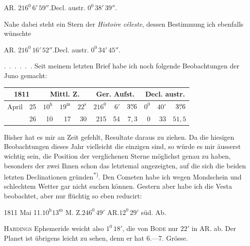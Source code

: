 \begin{center}
AR. $216^0\,6'\,59''$.\quad Decl. austr. $0^0\,38'\,39''$.
\end{center}
\noindent Nahe dabei steht ein Stern der \textit{Histoire céleste}, dessen Bestimmung ich ebenfalls wünschte
\begin{center}
AR. $216^0\,16'\,52''$.\quad Decl. austr. $0^0\,34'\,45''$.
\end{center}
\noindent\hspace*{\parindent}\mbox{. . . . . .} Seit meinem letzten Brief habe ich noch folgende Beobachtungen der Juno gemacht:
\begin{center}\renewcommand{\arraystretch}{1.15}
\begin{tabular}{lr|rrr|rrr|rrr}
\hline\hline
\multicolumn{2}{c|}{1811}&\multicolumn{3}{c|}{Mittl. Z.}&\multicolumn{3}{c|}{Ger. Aufst.}&\multicolumn{3}{c}{Decl. austr.}\\\hline\hline
April&25&$10^{\mathrm h}$&$19^{\mathrm m}$&$22^{\mathrm s}$&$216^0$&$6'$&$3\mathord{\overset{\prime\prime}{,}}6$&$0^0$&$40'$&$3\mathord{\overset{\prime\prime}{,}}6$\\
&26&10&17&30&215&54&$7{,}3$&0&33&$51{,}5$
\end{tabular}\end{center}
\noindent\hspace*{\parindent}Bisher hat es mir an Zeit gefehlt, Resultate daraus zu ziehen. Da die hiesigen Beobachtungen dieses Jahr vielleicht die einzigen sind, so würde es mir äusserst wichtig sein, die Position der verglichenen Sterne möglichst genau zu haben, besonders der zwei Ihnen schon das letztemal angezeigten, auf die sich die beiden letzten Declinationen gründen\textsuperscript{*)}.
\begingroup\renewcommand{\thefootnote}{*)}\endgroup
\clearpage{}
\noindent\hspace*{\parindent}Den Cometen habe ich wegen Mondschein und schlechtem Wetter gar nicht suchen können. Gestern aber habe ich die Vesta beobachtet, aber nur flüchtig so eben reducirt:
\begin{center}
1811 Mai 11.\quad $10^{\mathrm h}13^{\mathrm m}$ M. Z.\quad $246^0\,49'$ AR.\quad $12^0\,29'$ süd. Ab.
\end{center}
\noindent\textsc{Hardings} Ephemeride weicht also $1^0\,18'$, die von \textsc{Bode} nur $22'$ in AR. ab. Der Planet ist übrigens leicht zu sehen, denn er hat 6.—7. Grösse.
\clearpage\endgroup

